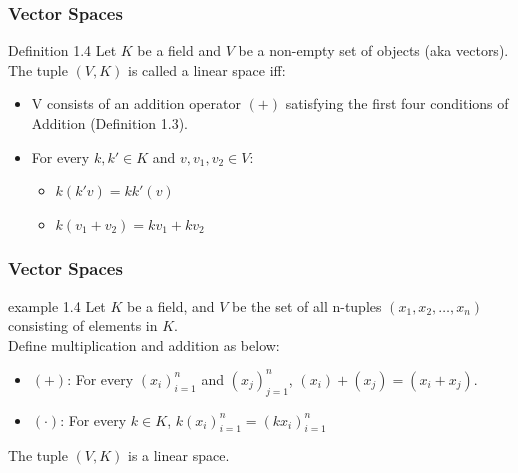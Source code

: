 \documentclass{beamer}
\begin{document}
\begin{frame}
    \frametitle{Vector Spaces}
    
    \begin{block}{Definition 1.4}
        Let $K$ be a field and $V$ be a non-empty set of objects (aka vectors). The tuple $(V,K)$ is called a linear space iff:

        \begin{itemize}
            \item V consists of an addition operator $(+)$ satisfying the first four conditions of Addition (Definition 1.3).
            \item For every $k,k' \in K$ and $v,v_1,v_2 \in V$:
            \begin{itemize}
                \item $k(k'v) = kk'(v)$
                \item $k(v_1 + v_2) = kv_1 + kv_2$
            \end{itemize}
        \end{itemize}
    \end{block}
\end{frame}

\begin{frame}
    \frametitle{Vector Spaces}

    \begin{exampleblock}{example 1.4}
        Let $K$ be a field, and $V$ be the set of all n-tuples $(x_1,x_2, \dots, x_n)$ consisting of elements in $K$.\\
        Define multiplication and addition as below:
        \begin{itemize}
            \item $(+)$: For every $(x_i)_{i=1}^{n}$ and $(x_j)_{j=1}^{n}$, $(x_i)+(x_j)= (x_i+x_j)$.
            \item $(\cdot)$: For every $k \in K$, $k(x_i)_{i=1}^{n} = (kx_i)_{i=1}^{n}$
        \end{itemize}
        The tuple $(V,K)$ is a linear space.
    \end{exampleblock}
\end{frame}
\end{document}
